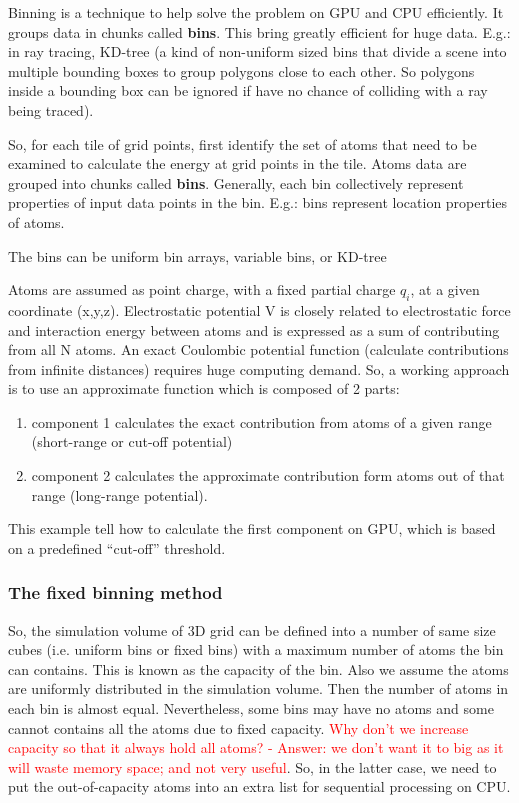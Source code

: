 Binning is a technique to help solve the problem on GPU and CPU
efficiently. It groups data in chunks called {\bf bins}. This bring
greatly efficient for huge data. E.g.: in ray tracing, KD-tree (a kind
of non-uniform sized bins that divide a scene into multiple bounding
boxes to group polygons close to each other. So polygons inside a
bounding box can be ignored if have no chance of colliding with a ray
being traced).

\begin{framed}
  So, for each tile of grid points, first identify the set of atoms
  that need to be examined to calculate the energy at grid points in
  the tile.  Atoms data are grouped into chunks called {\bf
    bins}.
  Generally, each bin collectively represent properties of input data
  points in the bin. E.g.: bins represent location properties of
  atoms.

  The bins can be uniform bin arrays, variable bins, or KD-tree
\end{framed}


Atoms are assumed as point charge, with a fixed partial charge $q_i$,
at a given coordinate (x,y,z). Electrostatic potential V is closely
related to electrostatic force and interaction energy between atoms
and is expressed as a sum of contributing from all N atoms.  An exact
Coulombic potential function (calculate contributions from infinite
distances) requires huge computing demand. So, a working approach is
to use an approximate function which is composed of 2 parts:
\begin{enumerate}
\item component 1 calculates the exact contribution from atoms of a
  given range (short-range or cut-off potential)
\item component 2 calculates the approximate contribution form atoms
  out of that range (long-range potential).
\end{enumerate}

This example tell how to calculate the first component on GPU, which
is based on a predefined ``cut-off'' threshold. 

\subsubsection{The fixed binning method}
\label{sec:binning-method}

So, the simulation volume of 3D grid can be defined into a number of
same size cubes (i.e. uniform bins or fixed bins) with a maximum
number of atoms the bin can contains. This is known as the capacity of
the bin. Also we assume the atoms are uniformly distributed in the
simulation volume. Then the number of atoms in each bin is almost
equal. Nevertheless, some bins may have no atoms and some cannot
contains all the atoms due to fixed capacity.
\textcolor{red}{Why don't we increase capacity so that it always hold
  all atoms? - Answer: we don't want it to big as it will waste memory
  space; and not very useful}.
So, in the latter case, we need to put the out-of-capacity atoms into
an extra list for sequential processing on CPU. 

